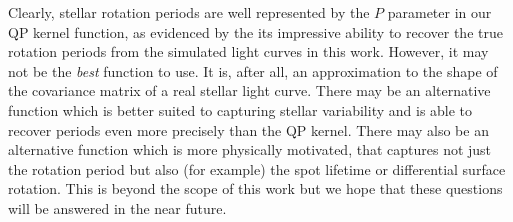 \documentclass[useAMS, usenatbib, preprint, 12pt]{aastex}
\begin{document}
Clearly, stellar rotation periods are well represented by the $P$ parameter in
our QP kernel function, as evidenced by the its impressive ability to recover
the true rotation periods from the simulated light curves in this work.
However, it may not be the {\it best} function to use.
It is, after all, an approximation to the shape of the covariance matrix of a
real stellar light curve.
There may be an alternative function which is better suited to capturing
stellar variability and is able to recover periods even more precisely than
the QP kernel.
There may also be an alternative function which is more physically motivated,
that captures not just the rotation period but also (for example) the spot
lifetime or differential surface rotation.
This is beyond the scope of this work but we hope that these questions will be
answered in the near future.
\end{document}
